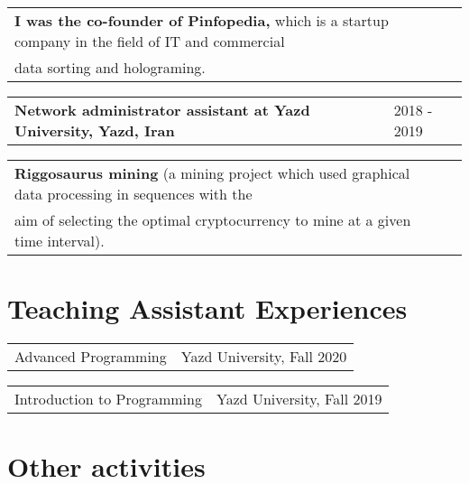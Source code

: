 \documentclass[letter,12pt]{article}
\begin{document}
\begin{tabularx}{\linewidth}{ @{}l r@{} }
\textbf{I was the co-founder of Pinfopedia,} which is a startup company in the field of IT and commercial \\
data sorting and holograming. \\
\end{tabularx}
\vspace{-0.3cm}

\begin{tabularx}{\linewidth}{ @{}l X@{} }
\textbf{Network administrator assistant at Yazd University, Yazd, Iran} & \hfill 2018 - 2019 \\
\end{tabularx}

\vspace{-0.1cm}

\begin{tabularx}{\linewidth}{ @{}l r@{} }
\textbf{Riggosaurus mining}  (a mining project which used graphical data processing in sequences with the \\
aim of selecting the optimal cryptocurrency to mine at a given time interval).\\
\end{tabularx}


\section{Teaching Assistant Experiences}

\begin{tabularx}{\linewidth}{ @{}l X@{} }
Advanced Programming & \hfill Yazd University, Fall 2020 \\[0pt]
\end{tabularx}
\vspace{-0.7cm}

\begin{tabularx}{\linewidth}{ @{}l X@{} }
Introduction to Programming & \hfill Yazd University, Fall 2019 \\
\end{tabularx}
\vspace{-0.7cm}




\section{Other activities}
\end{document}
